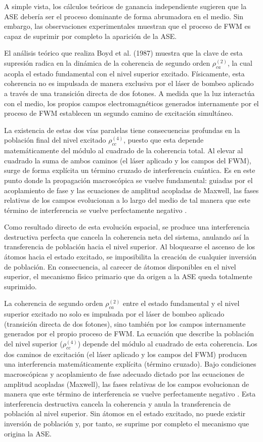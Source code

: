 \documentclass[12pt,a4paper]{article}
\begin{document}
A simple vista, los cálculos teóricos de ganancia independiente sugieren que la ASE 
debería ser el proceso dominante de forma abrumadora en el medio. Sin embargo, las observaciones 
experimentales muestran que el proceso de FWM es capaz de suprimir por completo la aparición de
la ASE.

El análisis teórico que realiza Boyd et al. (1987) muestra que la clave de esta supresión 
radica en la dinámica de la coherencia de segundo orden $\rho_{ca}^{(2)}$, la cual acopla 
el estado fundamental con el nivel superior excitado. Físicamente, esta coherencia no 
es impulsada de manera exclusiva por el láser de bombeo aplicado a través de una 
transición directa de dos fotones. A medida que la luz interactúa con el medio,
los propios campos electromagnéticos generados internamente por el proceso de 
FWM establecen un segundo camino de excitación simultáneo. 

La existencia de estas dos vías paralelas tiene consecuencias profundas en la población final del nivel excitado $\rho_{cc}^{(4)}$, puesto que esta depende matemáticamente del módulo al cuadrado de la coherencia total. Al elevar al cuadrado la suma de ambos caminos (el láser aplicado y los campos del FWM), surge de forma explícita un término cruzado de interferencia cuántica. Es en este punto donde la propagación macroscópica se vuelve fundamental: guiadas por el acoplamiento de fase y las ecuaciones de amplitud acopladas de Maxwell, las fases relativas de los campos evolucionan a lo largo del medio de tal manera que este término de interferencia se vuelve perfectamente negativo \cite{Boyd1987}.

Como resultado directo de esta evolución espacial, se produce una interferencia destructiva perfecta que cancela la coherencia neta del sistema, anulando así la transferencia de población hacia el nivel superior. Al bloquearse el ascenso de los átomos hacia el estado excitado, se imposibilita la creación de cualquier inversión de población. En consecuencia, al carecer de átomos disponibles en el nivel superior, el mecanismo físico primario que da origen a la ASE queda totalmente suprimido.

La coherencia de segundo orden $\rho_{ca}^{(2)}$ entre el estado fundamental y el nivel superior excitado no solo es impulsada por el láser de bombeo aplicado (transición directa de dos fotones), sino también por los campos internamente generados por el propio proceso de FWM.
La ecuación que describe la población del nivel superior ($\rho_{cc}^{(4)}$) depende del módulo al cuadrado de esta coherencia. Los dos caminos de excitación (el láser aplicado y los campos del FWM) producen una interferencia matemáticamente explícita (término cruzado). Bajo condiciones macroscópicas y acoplamiento de fase adecuado dictado por las ecuaciones de amplitud acopladas (Maxwell), las fases relativas de los campos evolucionan de manera que este término de interferencia se vuelve perfectamente negativo \cite{Boyd1987}.
Esta interferencia destructiva cancela la coherencia y anula la transferencia de población al nivel superior. Sin átomos en el estado excitado, no puede existir inversión de población y, por tanto, se suprime por completo el mecanismo que origina la ASE.
\end{document}
